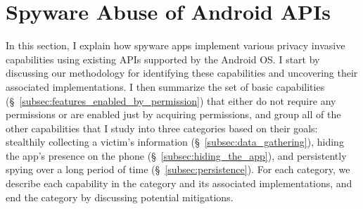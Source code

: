 \section{Spyware Abuse of Android APIs}
\label{sec:api-abuse}

In this section, I explain how spyware apps implement various privacy invasive
capabilities using existing APIs supported by the Android OS.
I start by discussing our methodology for identifying these capabilities and uncovering their associated implementations.
I then summarize the set of basic capabilities (\S~\ref{subsec:features_enabled_by_permission}) that either do not require any permissions or are enabled just by acquiring permissions,
and group
all of the other capabilities that I study into three categories based on their goals: stealthily
collecting a victim's information (\S~\ref{subsec:data_gathering}), hiding the app's presence on the phone (\S~\ref{subsec:hiding_the_app}), and persistently
spying over a long period of time (\S~\ref{subsec:persistence}).
For each category, we
describe
each capability in the category and its associated implementations, and end
the category by discussing potential mitigations.


